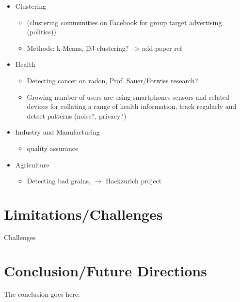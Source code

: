 \documentclass[conference,compsoc]{IEEEtran}
\begin{document}
\begin{itemize}
    \item Clustering
        \begin{itemize}
            \item (clustering communities on Facebook for group target advertising (politics))
            \item Methods: k-Means, DJ-clustering? --> add paper ref
        \end{itemize}
    \item Health
        \begin{itemize}
            \item Detecting cancer on radon, Prof. Sauer/Forwiss research?
            \item Growing number of users are using smartphones sensors and related devices for 
                collating a range of health information, track regularly and detect patterns (noise?, privacy?)
        \end{itemize}
    \item Industry and Manufacturing
        \begin{itemize}
            \item quality assurance
        \end{itemize}
    \item Agriculture
        \begin{itemize}
            \item Detecting bad grains, $\rightarrow$ Hackzurich project
        \end{itemize}
\end{itemize}


\section{Limitations/Challenges}
Challenges


\section{Conclusion/Future Directions}
The conclusion goes here.


%
%
\end{document}
